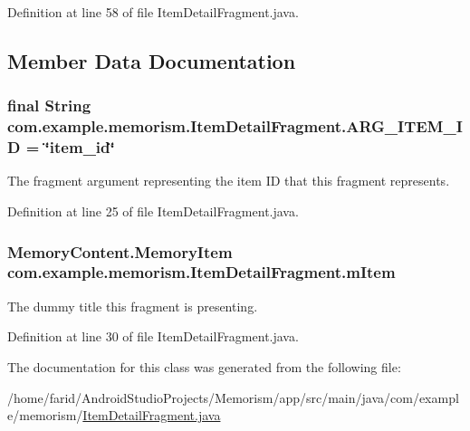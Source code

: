 Definition at line 58 of file Item\+Detail\+Fragment.\+java.



\subsection{Member Data Documentation}
\subsubsection[{\texorpdfstring{A\+R\+G\+\_\+\+I\+T\+E\+M\+\_\+\+ID}{ARG_ITEM_ID}}]{\setlength{\rightskip}{0pt plus 5cm}final String com.\+example.\+memorism.\+Item\+Detail\+Fragment.\+A\+R\+G\+\_\+\+I\+T\+E\+M\+\_\+\+ID = \char`\"{}item\+\_\+id\char`\"{}\hspace{0.3cm}{\ttfamily [static]}}\hypertarget{classcom_1_1example_1_1memorism_1_1_item_detail_fragment_a580108a1952bf48a351a80530dd5223c}{}\label{classcom_1_1example_1_1memorism_1_1_item_detail_fragment_a580108a1952bf48a351a80530dd5223c}
The fragment argument representing the item ID that this fragment represents. 

Definition at line 25 of file Item\+Detail\+Fragment.\+java.

\subsubsection[{\texorpdfstring{m\+Item}{mItem}}]{\setlength{\rightskip}{0pt plus 5cm}Memory\+Content.\+Memory\+Item com.\+example.\+memorism.\+Item\+Detail\+Fragment.\+m\+Item\hspace{0.3cm}{\ttfamily [static]}}\hypertarget{classcom_1_1example_1_1memorism_1_1_item_detail_fragment_ac763290f824e91141020dc2a61e424b4}{}\label{classcom_1_1example_1_1memorism_1_1_item_detail_fragment_ac763290f824e91141020dc2a61e424b4}
The dummy title this fragment is presenting. 

Definition at line 30 of file Item\+Detail\+Fragment.\+java.



The documentation for this class was generated from the following file\+:\begin{DoxyCompactItemize}
\item 
/home/farid/\+Android\+Studio\+Projects/\+Memorism/app/src/main/java/com/example/memorism/\hyperlink{_item_detail_fragment_8java}{Item\+Detail\+Fragment.\+java}\end{DoxyCompactItemize}
